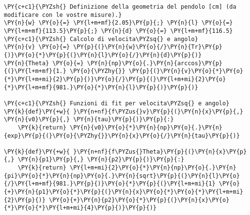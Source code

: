 \begin{Verbatim}[label=\makebox{\href{https://github.com/unipi-physics-labs/lab1-sheets/tree/main/snippy/plasduino_pendulum.py}{https://github.com/.../plasduino\_pendulum.py}},commandchars=\\\{\}]
\PY{c+c1}{\PYZsh{} Definizione della geometria del pendolo [cm] (da modificare con le vostre misure).}
\PY{n}{w} \PY{o}{=} \PY{l+m+mf}{2.05}\PY{p}{;} \PY{n}{l} \PY{o}{=} \PY{l+m+mf}{113.5}\PY{p}{;} \PY{n}{d} \PY{o}{=} \PY{l+m+mf}{116.5}
\PY{c+c1}{\PYZsh{} Calcolo di velocita\PYZsq{} e angolo}
\PY{n}{v} \PY{o}{=} \PY{p}{(}\PY{n}{w}\PY{o}{/}\PY{n}{Tr}\PY{p}{)}\PY{o}{*}\PY{p}{(}\PY{n}{l}\PY{o}{/}\PY{n}{d}\PY{p}{)}
\PY{n}{Theta} \PY{o}{=} \PY{n}{np}\PY{o}{.}\PY{n}{arccos}\PY{p}{(}\PY{l+m+mf}{1.} \PY{o}{\PYZhy{}} \PY{p}{(}\PY{n}{v}\PY{o}{*}\PY{o}{*}\PY{l+m+mi}{2}\PY{p}{)}\PY{o}{/}\PY{p}{(}\PY{l+m+mi}{2}\PY{o}{*}\PY{l+m+mf}{981.}\PY{o}{*}\PY{n}{l}\PY{p}{)}\PY{p}{)}

\PY{c+c1}{\PYZsh{} Funzioni di fit per velocita\PYZsq{} e angolo}
\PY{k}{def}\PY{+w}{ }\PY{n+nf}{f\PYZus{}v}\PY{p}{(}\PY{n}{x}\PY{p}{,} \PY{n}{v0}\PY{p}{,} \PY{n}{tau}\PY{p}{)}\PY{p}{:}
    \PY{k}{return} \PY{n}{v0}\PY{o}{*}\PY{n}{np}\PY{o}{.}\PY{n}{exp}\PY{p}{(}\PY{o}{\PYZhy{}}\PY{n}{x}\PY{o}{/}\PY{n}{tau}\PY{p}{)}

\PY{k}{def}\PY{+w}{ }\PY{n+nf}{f\PYZus{}Theta}\PY{p}{(}\PY{n}{x}\PY{p}{,} \PY{n}{p1}\PY{p}{,} \PY{n}{p2}\PY{p}{)}\PY{p}{:}
    \PY{k}{return} \PY{l+m+mi}{2}\PY{o}{*}\PY{n}{np}\PY{o}{.}\PY{n}{pi}\PY{o}{*}\PY{n}{np}\PY{o}{.}\PY{n}{sqrt}\PY{p}{(}\PY{n}{l}\PY{o}{/}\PY{l+m+mf}{981.}\PY{p}{)}\PY{o}{*}\PY{p}{(}\PY{l+m+mi}{1} \PY{o}{+}\PY{n}{p1}\PY{o}{*}\PY{p}{(}\PY{n}{x}\PY{o}{*}\PY{o}{*}\PY{l+m+mi}{2}\PY{p}{)} \PY{o}{+}\PY{n}{p2}\PY{o}{*}\PY{p}{(}\PY{n}{x}\PY{o}{*}\PY{o}{*}\PY{l+m+mi}{4}\PY{p}{)}\PY{p}{)}


\end{Verbatim}
